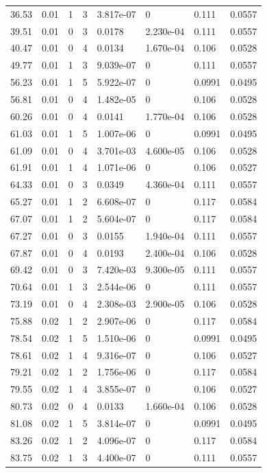 \documentclass[preview]{standalone}
\begin{document}
{{\begin{tabular}{L{1.2cm}C{1.2cm} C{0.3cm}C{0.5cm} C{1.4cm}C{1.4cm} C{1.4cm}C{1.4cm}}
  36.53  &  0.01  & 1     &  3 &  3.817e-07  & 0  & 0.111 &  0.0557   \\ 
  39.51  &  0.01  & 0     &  3 &  0.0178  & 2.230e-04  & 0.111 &  0.0557   \\ 
  40.47  &  0.01  & 0     &  4 &  0.0134  & 1.670e-04  & 0.106 &  0.0528   \\ 
  49.77  &  0.01  & 1     &  3 &  9.039e-07  & 0  & 0.111 &  0.0557   \\ 
  56.23  &  0.01  & 1     &  5 &  5.922e-07  & 0  & 0.0991 &  0.0495   \\ 
  56.81  &  0.01  & 0     &  4 &  1.482e-05  & 0  & 0.106 &  0.0528   \\ 
  60.26  &  0.01  & 0     &  4 &  0.0141  & 1.770e-04  & 0.106 &  0.0528   \\ 
  61.03  &  0.01  & 1     &  5 &  1.007e-06  & 0  & 0.0991 &  0.0495   \\ 
  61.09  &  0.01  & 0     &  4 &  3.701e-03  & 4.600e-05  & 0.106 &  0.0528   \\ 
  61.91  &  0.01  & 1     &  4 &  1.071e-06  & 0  & 0.106 &  0.0527   \\ 
  64.33  &  0.01  & 0     &  3 &  0.0349  & 4.360e-04  & 0.111 &  0.0557   \\ 
  65.27  &  0.01  & 1     &  2 &  6.608e-07  & 0  & 0.117 &  0.0584   \\ 
  67.07  &  0.01  & 1     &  2 &  5.604e-07  & 0  & 0.117 &  0.0584   \\ 
  67.27  &  0.01  & 0     &  3 &  0.0155  & 1.940e-04  & 0.111 &  0.0557   \\ 
  67.87  &  0.01  & 0     &  4 &  0.0193  & 2.400e-04  & 0.106 &  0.0528   \\ 
  69.42  &  0.01  & 0     &  3 &  7.420e-03  & 9.300e-05  & 0.111 &  0.0557   \\ 
  70.64  &  0.01  & 1     &  3 &  2.544e-06  & 0  & 0.111 &  0.0557   \\ 
  73.19  &  0.01  & 0     &  4 &  2.308e-03  & 2.900e-05  & 0.106 &  0.0528   \\ 
  75.88  &  0.02  & 1     &  2 &  2.907e-06  & 0  & 0.117 &  0.0584   \\ 
  78.54  &  0.02  & 1     &  5 &  1.510e-06  & 0  & 0.0991 &  0.0495   \\ 
  78.61  &  0.02  & 1     &  4 &  9.316e-07  & 0  & 0.106 &  0.0527   \\ 
  79.21  &  0.02  & 1     &  2 &  1.756e-06  & 0  & 0.117 &  0.0584   \\ 
  79.55  &  0.02  & 1     &  4 &  3.855e-07  & 0  & 0.106 &  0.0527   \\ 
  80.73  &  0.02  & 0     &  4 &  0.0133  & 1.660e-04  & 0.106 &  0.0528   \\ 
  81.08  &  0.02  & 1     &  5 &  3.814e-07  & 0  & 0.0991 &  0.0495   \\ 
  83.26  &  0.02  & 1     &  2 &  4.096e-07  & 0  & 0.117 &  0.0584   \\ 
  83.75  &  0.02  & 1     &  3 &  4.400e-07  & 0  & 0.111 &  0.0557   \\ 
\hline 
\end{tabular} 

}}
\end{document}
